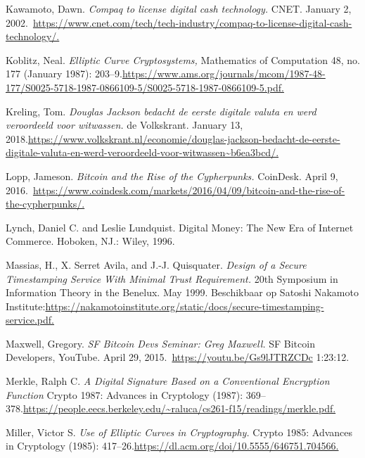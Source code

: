 \documentclass[smalldemyvopaper,11pt,twoside,onecolumn,openright,extrafontsizes,hidelinks]{memoir}
\begin{document}
Kawamoto, Dawn. \emph{Compaq to license digital cash technology.} CNET.
January 2,
2002.~\href{https://www.cnet.com/tech/tech-industry/compaq-to-license-digital-cash-technology/}{https://www.cnet.com/tech/tech-industry/compaq-to-license-digital-cash-technology/.}

Koblitz, Neal. \emph{Elliptic Curve Cryptosystems,} Mathematics of
Computation 48, no. 177 (January 1987):
203--9.\href{https://www.ams.org/journals/mcom/1987-48-177/S0025-5718-1987-0866109-5/S0025-5718-1987-0866109-5.pdf}{https://www.ams.org/journals/mcom/1987-48-177/S0025-5718-1987-0866109-5/S0025-5718-1987-0866109-5.pdf.}

Kreling, Tom. \emph{Douglas Jackson bedacht de eerste digitale valuta en
werd veroordeeld voor witwassen.} de Volkskrant. January 13,
2018.\href{https://www.volkskrant.nl/economie/douglas-jackson-bedacht-de-eerste-digitale-valuta-en-werd-veroordeeld-voor-witwassen~b6ea3bcd/}{https://www.volkskrant.nl/economie/douglas-jackson-bedacht-de-eerste-digitale-valuta-en-werd-veroordeeld-voor-witwassen\textasciitilde b6ea3bcd/.}

Lopp, Jameson. \emph{Bitcoin and the Rise of the Cypherpunks.} CoinDesk.
April 9,
2016.~\href{https://www.coindesk.com/markets/2016/04/09/bitcoin-and-the-rise-of-the-cypherpunks/}{https://www.coindesk.com/markets/2016/04/09/bitcoin-and-the-rise-of-the-cypherpunks/.}

Lynch, Daniel C. and Leslie Lundquist. Digital Money: The New Era of
Internet Commerce. Hoboken, NJ.: Wiley, 1996.

Massias, H., X. Serret Avila, and J.-J. Quisquater. \emph{Design of a
Secure Timestamping Service With Minimal Trust Requirement.} 20th
Symposium in Information Theory in the Benelux. May 1999. Beschikbaar op
Satoshi Nakamoto
Institute:\href{https://nakamotoinstitute.org/static/docs/secure-timestamping-service.pdf}{https://nakamotoinstitute.org/static/docs/secure-timestamping-service.pdf.}

Maxwell, Gregory. \emph{SF Bitcoin Devs Seminar: Greg Maxwell.} SF
Bitcoin Developers, YouTube. April 29,
2015.~\url{https://youtu.be/Gs9lJTRZCDc} 1:23:12.

Merkle, Ralph C. \emph{A Digital Signature Based on a Conventional
Encryption Function} Crypto 1987: Advances in Cryptology (1987):
369--378.\href{https://people.eecs.berkeley.edu/~raluca/cs261-f15/readings/merkle.pdf}{https://people.eecs.berkeley.edu/\textasciitilde raluca/cs261-f15/readings/merkle.pdf.}

Miller, Victor S. \emph{Use of Elliptic Curves in Cryptography.} Crypto
1985: Advances in Cryptology (1985):
417--26.\href{https://dl.acm.org/doi/10.5555/646751.704566}{https://dl.acm.org/doi/10.5555/646751.704566.}
\end{document}
